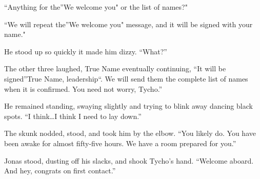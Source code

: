 ``Anything for the''We welcome you" or the list of names?"

``We will repeat the''We welcome you" message, and it will be signed with your name."

He stood up so quickly it made him dizzy. ``What?''

The other three laughed, True Name eventually continuing, ``It will be signed''True Name, leadership``. We will send them the complete list of names when it is confirmed. You need not worry, Tycho.''

He remained standing, swaying slightly and trying to blink away dancing black spots. ``I think\ldots I think I need to lay down.''

The skunk nodded, stood, and took him by the elbow. ``You likely do. You have been awake for almost fifty-five hours. We have a room prepared for you.''

Jonas stood, dusting off his slacks, and shook Tycho's hand. ``Welcome aboard. And hey, congrats on first contact.''
